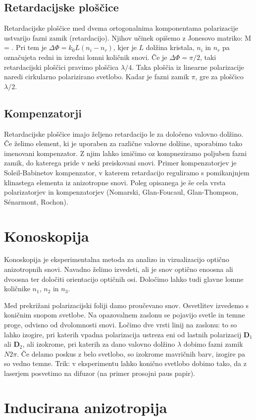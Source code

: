 \subsection*{Retardacijske ploščice}
Retardacijske ploščice med dvema ortogonalnima komponentama polarizacije ustvarijo
fazni zamik (retardacijo). Njihov učinek opišemo z Jonesovo matriko:
\beq
M = 
\!\!.
\eeq
Pri tem je $\Delta \Phi = k_0 L (n_i-n_r)$, kjer je $L$ dolžina kristala, $n_i$ in $n_r$
pa označujeta redni in izredni lomni količnik snovi. Če je $\Delta \Phi= \pi/2$, taki 
retardacijski ploščici pravimo ploščica $\lambda/4$. Taka ploščia iz linearne polarizacije
naredi cirkularno polarizirano svetlobo. Kadar je fazni zamik $\pi$, gre za ploščico $\lambda/2$.

\subsection*{Kompenzatorji}
Retardacijske ploščice imajo željeno retardacijo le za določeno valovno dolžino. Če 
želimo element, ki je uporaben za različne valovne dolžine, uporabimo tako imenovani
kompenzator. Z njim lahko izničimo oz kompneziramo poljuben fazni zamik, do katerega pride
v neki preiskovani snovi. Primer kompenzatorjev je Soleil-Babinetov kompenzator, v katerem
retardacijo reguliramo s pomikanjnjem klinastega elementa iz anizotropne snovi. Poleg opisanega
je še cela vrsta polarizatorjev in kompenzatorjev (Nomarski, Glan-Foucaul, Glan-Thompson, S{\'e}narmont, 
Rochon).

\section{Konoskopija}
Konoskopija je eksperimentalna metoda za analizo in vizualizacijo optično anizotropnih snovi. 
Navadno želimo izvedeti, ali je snov optično enoosna ali dvoosna ter določiti orientacijo 
optičnih osi. Določimo lahko tudi glavne lomne količnike $n_1$, $n_2$ in $n_3$. 

Med prekrižani polarizacijski foliji damo proučevano snov. Osvetlitev izvedemo s koničnim
snopom svetlobe. Na opazovalnem zaslonu se pojavijo svetle in temne proge, odvisno
od dvolomnosti snovi. Ločimo dve vrsti linij na zaslonu: to so lahko izogire, pri katerih vpadna
polarizacija ustreza eni od lastnih polarizacij $\mathbf{D}_1$ ali $\mathbf{D}_2$, ali
izokrome, pri katerih za dano valovno dolžino $\lambda$ dobimo fazni zamik $N2\pi$. 
Če delamo poskus z belo svetlobo, so izokrome mavričnih barv, izogire pa so vedno temne.
Trik: v eksperimentu lahko konično svetlobo dobimo tako, da z laserjem posvetimo
na difuzor (na primer prosojni paus papir).



\section{Inducirana anizotropija}
